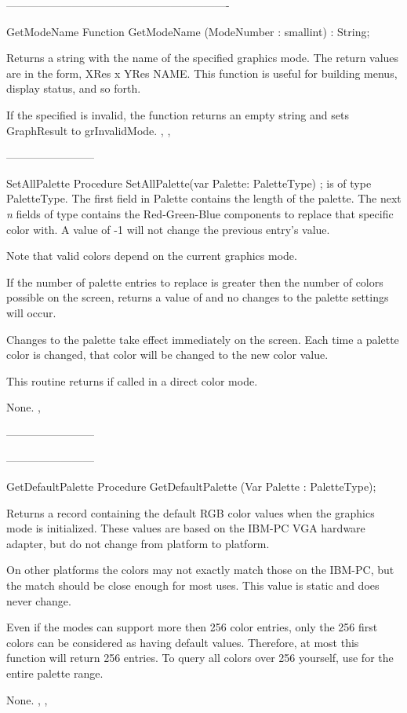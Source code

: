 -------------------------------------------------------------
\begin{function}{GetModeName}
\Declaration
Function GetModeName (ModeNumber : smallint) : String;

\Description

Returns a string with the name of the specified graphics mode. The
return values are in the form, XRes x YRes NAME. This function is
useful for building menus, display status, and so forth.

\Errors
If the specified  is invalid, the function returns an
empty string and sets GraphResult to grInvalidMode.
\SeeAlso
{}, , 
\end{function}
------------------------
\begin{procedure}{SetAllPalette}
\Declaration
Procedure SetAllPalette(var Palette: PaletteType) ;
\Description
{} is of type PaletteType. The first field in Palette
contains the length of the palette. The next \textit{n} fields of
type  contains the Red-Green-Blue components to replace
that specific color with. A value of -1 will not change the previous
entry's value.

Note that valid colors depend on the current graphics mode.

If the number of palette entries to replace is greater then the
number of colors possible on the screen,  returns
a value of  and no changes to the palette settings will
occur.

Changes to the palette take effect immediately on the screen. Each time
a palette color is changed, that color will be changed to the new color
value.

This routine returns  if called in a direct color mode.

\Errors
None.
\SeeAlso
{}, 
\end{procedure}
------------------------

------------------------
\begin{procedure}{GetDefaultPalette}
\Declaration
Procedure GetDefaultPalette (Var Palette : PaletteType);

\Description
Returns a  record containing the default RGB color
values when the graphics mode is initialized. These values are based
on the IBM-PC VGA hardware adapter, but do not change from platform
to platform.

On other platforms the colors may not exactly match those
on the IBM-PC, but the match should be close enough for most uses. This
value is static and does never change.

Even if the modes can support more then 256 color entries, only the
256 first colors can be considered as having default values. Therefore,
at most this function will return 256 entries. To query all colors over
256 yourself, use  for the entire palette range.

\Errors
None.
\SeeAlso
{}, , 
\end{procedure}


